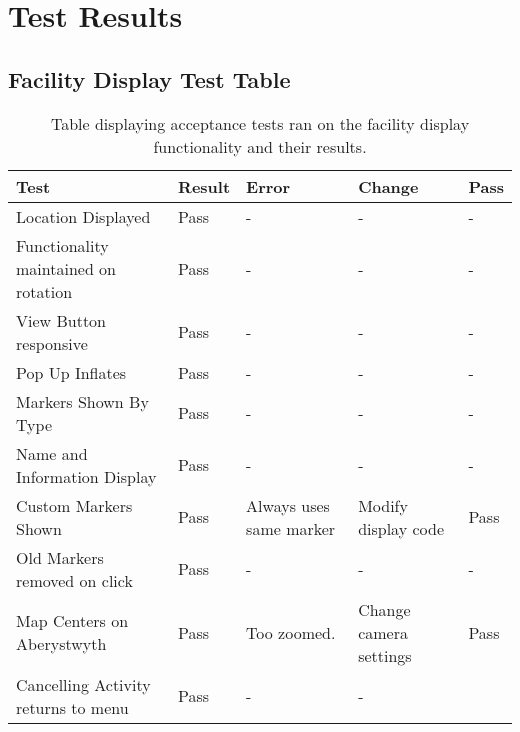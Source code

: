 \chapter{Test Results}
\section{Facility Display Test Table}
\begin{table}[h]
\begin{tabular}{|l|l|l|l|l|}
\hline
\textbf{Test}                          & \textbf{Result} & \textbf{Error}          & \textbf{Change}            & \textbf{Pass} \\ \hline
Location Displayed                     & Pass            & -                       & -                          & -             \\ \hline
Functionality maintained on rotation   & Pass            & -                       & -                          & -             \\ \hline
View Button responsive                 & Pass            & -                       & -                          & -             \\ \hline
Pop Up Inflates                        & Pass            & -                       & -                          & -             \\ \hline
Markers Shown By Type                  & Pass            & -                       & -                          & -             \\ \hline
Name and Information Display & Pass            & -                       & -                          & -             \\ \hline
Custom Markers Shown                   & Pass            & Always uses same marker & Modify display code & Pass          \\ \hline
Old Markers removed on click           & Pass            & -                       & -                          & -             \\ \hline
Map Centers on Aberystwyth             & Pass            & Too zoomed.             & Change camera settings     & Pass          \\ \hline
Cancelling Activity returns to menu    & Pass            & -                       & -                          &               \\ \hline
\end{tabular}
\caption[Facility Display Tests]{Table displaying acceptance tests ran on the facility display functionality and their results.}
\end{table}
\newpage
